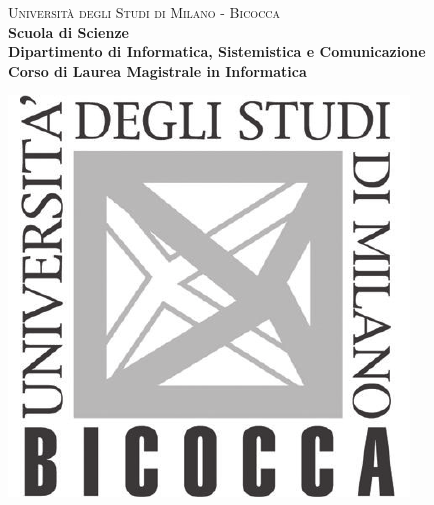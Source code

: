 \begin{titlepage}
    \centering

    
    \begin{minipage}[t]{1\textwidth}
        \centering
    {
            {\LARGE\textsc{Università degli Studi di Milano - Bicocca}} \\
            \Large\textbf{Scuola di Scienze} \\
            \large\textbf{Dipartimento di Informatica, Sistemistica e Comunicazione} \\
            \textbf{Corso di Laurea Magistrale in Informatica} \\
            \par
    }
    \end{minipage}
    
    \centering
    \begin{minipage}[t]{\textwidth}
        \vspace{10mm}
    \end{minipage}
     
    \centering
    \begin{minipage}[t]{1\textwidth}
    \centering
    \includegraphics[scale=0.7]{assets/logo-bicocca.pdf}
    \end{minipage}
    

\end{titlepage}
